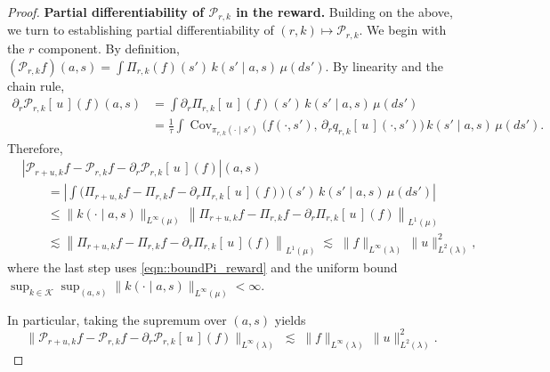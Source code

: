 \documentclass[11pt]{article}
\theoremstyle{plain}
\begin{document}
\begin{proof}
\noindent \textbf{Partial differentiability of $\mathcal{P}_{r,k}$ in the reward.} Building on the above, we turn to establishing partial differentiability of $(r, k) \mapsto \mathcal{P}_{r,k}$. We begin with the $r$ component. By definition, $(\mathcal{P}_{r,k}f)(a,s)=\int \Pi_{r,k}(f)(s')\,k(s'\mid a,s)\,\mu(ds')$.
By linearity and the chain rule,
\begin{align*}
\partial_r \mathcal{P}_{r,k}[\,u\,](f)(a,s)
&= \int \partial_r \Pi_{r,k}[\,u\,](f)(s')\,k(s'\mid a,s)\,\mu(ds') \\
&= \frac{1}{\tau}\int \operatorname{Cov}_{\pi_{r,k}(\cdot\mid s')}
   \!\Big(f(\cdot,s'),\,\partial_r q_{r,k}[\,u\,](\cdot,s')\Big)\,
   k(s'\mid a,s)\,\mu(ds').
\end{align*}
Therefore,
\begin{align*}
&\left| \mathcal{P}_{r+u,k}f - \mathcal{P}_{r,k}f - \partial_r \mathcal{P}_{r,k}[\,u\,](f) \right|(a,s) \\
&\qquad= \left|\int \Big(\Pi_{r+u,k}f - \Pi_{r,k}f - \partial_r \Pi_{r,k}[\,u\,](f)\Big)(s')\,k(s'\mid a,s)\,\mu(ds')\right| \\
&\qquad\le \|k(\cdot\mid a,s)\|_{L^\infty(\mu)}\,
          \left\|\Pi_{r+u,k}f - \Pi_{r,k}f - \partial_r \Pi_{r,k}[\,u\,](f)\right\|_{L^1(\mu)} \\
&\qquad\lesssim \left\|\Pi_{r+u,k}f - \Pi_{r,k}f - \partial_r \Pi_{r,k}[\,u\,](f)\right\|_{L^1(\mu)}
\;\lesssim\; \|f\|_{L^\infty(\lambda)}\,\|u\|_{L^2(\lambda)}^2,
\end{align*}
where the last step uses \eqref{eqn::boundPi_reward} and the uniform bound
$\sup_{k \in \mathcal{K}} \sup_{(a,s)}\|k(\cdot\mid a,s)\|_{L^\infty(\mu)} < \infty$.

\noindent In particular, taking the supremum over $(a,s)$ yields
\[
\big\|\mathcal{P}_{r+u,k}f - \mathcal{P}_{r,k}f - \partial_r \mathcal{P}_{r,k}[\,u\,](f)\big\|_{L^\infty(\lambda)}
\;\lesssim\; \|f\|_{L^\infty(\lambda)}\,\|u\|_{L^2(\lambda)}^2.
\]



\end{proof}
\end{document}
